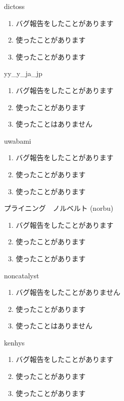 \begin{prework}{ dictoss }
  \begin{enumerate}
  \item バグ報告をしたことがあります
  \item 使ったことがあります
  \item 使ったことがあります
  \end{enumerate}
\end{prework}

\begin{prework}{ yy\_y\_ja\_jp }
  \begin{enumerate}
  \item バグ報告をしたことがあります
  \item 使ったことがあります
  \item 使ったことはありません
  \end{enumerate}
\end{prework}

\begin{prework}{ uwabami }
  \begin{enumerate}
  \item バグ報告をしたことがあります
  \item 使ったことがあります
  \item 使ったことがあります
  \end{enumerate}
\end{prework}

\begin{prework}{ プライニング　ノルベルト (norbu) }
  \begin{enumerate}
  \item バグ報告をしたことがあります
  \item 使ったことがあります
  \item 使ったことがあります 
  \end{enumerate}
\end{prework}

\begin{prework}{ noncatalyst }
  \begin{enumerate}
  \item バグ報告をしたことがありません
  \item 使ったことがあります
  \item 使ったことはありません
  \end{enumerate}
\end{prework}

\begin{prework}{ kenhys }
  \begin{enumerate}
  \item バグ報告をしたことがあります
  \item 使ったことがあります
  \item 使ったことがあります
  \end{enumerate}
\end{prework}

